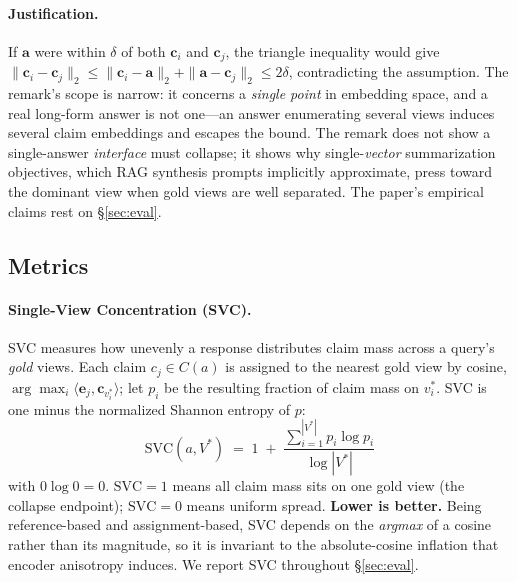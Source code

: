 \documentclass[11pt]{article}
\begin{document}
\paragraph{Justification.}
If $\mathbf{a}$ were within $\delta$ of both $\mathbf{c}_i$ and
$\mathbf{c}_j$, the triangle inequality would give
$\|\mathbf{c}_i-\mathbf{c}_j\|_2 \leq
\|\mathbf{c}_i-\mathbf{a}\|_2 + \|\mathbf{a}-\mathbf{c}_j\|_2 \leq 2\delta$,
contradicting the assumption.  The remark's scope is narrow: it concerns a
\emph{single point} in embedding space, and a real long-form answer is not
one---an answer enumerating several views induces several claim embeddings and
escapes the bound.  The remark does not show a single-answer \emph{interface} must
collapse; it shows why single-\emph{vector} summarization objectives, which RAG
synthesis prompts implicitly approximate, press toward the dominant view when
gold views are well separated.  The paper's empirical claims rest on
\S\ref{sec:eval}.

\subsection{Metrics}
\label{sec:metrics}

\paragraph{Single-View Concentration (SVC).}
SVC measures how unevenly a response distributes claim mass across a query's
\emph{gold} views.  Each claim $c_j\in C(a)$ is assigned to the nearest gold
view by cosine, $\arg\max_i \langle \mathbf{e}_j, \mathbf{c}_{v^*_i}\rangle$;
let $p_i$ be the resulting fraction of claim mass on $v^*_i$.  SVC is one minus
the normalized Shannon entropy of $p$:
\begin{equation}
\label{eq:svc}
\mathrm{SVC}(a, V^*) \;=\; 1 \;+\;
  \frac{\sum_{i=1}^{|V^*|} p_i \log p_i}{\log |V^*|}
\end{equation}
with $0\log 0=0$.  $\mathrm{SVC}{=}1$ means all claim mass sits on one gold
view (the collapse endpoint); $\mathrm{SVC}{=}0$ means uniform spread.
\textbf{Lower is better.}  Being reference-based and assignment-based, SVC
depends on the \emph{argmax} of a cosine rather than its magnitude, so it is
invariant to the absolute-cosine inflation that encoder anisotropy induces.  We
report SVC throughout \S\ref{sec:eval}.
\end{document}
